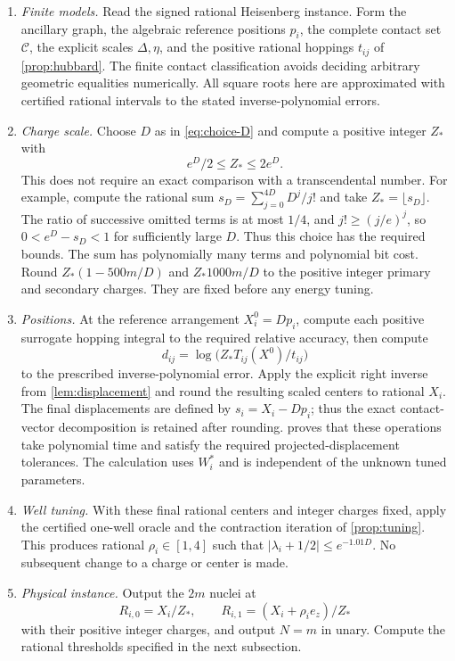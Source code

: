 \begin{enumerate}[label=\arabic*.,leftmargin=*]
\item \emph{Finite models.} Read the signed rational Heisenberg instance. Form the ancillary graph, the algebraic reference positions $p_i$, the complete contact set $\mathcal C$, the explicit scales $\Delta,\eta$, and the positive rational hoppings $t_{ij}$ of \cref{prop:hubbard}. The finite contact classification avoids deciding arbitrary geometric equalities numerically. All square roots here are approximated with certified rational intervals to the stated inverse-polynomial errors.

\item \emph{Charge scale.} Choose $D$ as in \cref{eq:choice-D} and compute a positive integer $Z_*$ with
\[
e^D/2\le Z_*\le2e^D.
\]
This does not require an exact comparison with a transcendental number. For example, compute the rational sum $s_D=\sum_{j=0}^{4D}D^j/j!$ and take $Z_*=\lfloor s_D\rfloor$. The ratio of successive omitted terms is at most $1/4$, and $j!\ge(j/e)^j$, so $0<e^D-s_D<1$ for sufficiently large $D$. Thus this choice has the required bounds. The sum has polynomially many terms and polynomial bit cost. Round $Z_*(1-500m/D)$ and $Z_*1000m/D$ to the positive integer primary and secondary charges. They are fixed before any energy tuning.

\item \emph{Positions.} At the reference arrangement $X_i^0=Dp_i$, compute each positive surrogate hopping integral to the required relative accuracy, then compute
\[
d_{ij}=\log\bigl(Z_*T_{ij}(X^0)/t_{ij}\bigr)
\]
to the prescribed inverse-polynomial error. Apply the explicit right inverse from \cref{lem:displacement} and round the resulting scaled centers to rational $X_i$. The final displacements are defined by $s_i=X_i-Dp_i$; thus the exact contact-vector decomposition is retained after rounding.  proves that these operations take polynomial time and satisfy the required projected-displacement tolerances. The calculation uses $W_i^*$ and is independent of the unknown tuned parameters.

\item \emph{Well tuning.} With these final rational centers and integer charges fixed, apply the certified one-well oracle and the contraction iteration of \cref{prop:tuning}. This produces rational $\rho_i\in[1,4]$ such that $|\lambda_i+1/2|\le e^{-1.01D}$. No subsequent change to a charge or center is made.

\item \emph{Physical instance.} Output the $2m$ nuclei at
\[
R_{i,0}=X_i/Z_*,\qquad
R_{i,1}=(X_i+\rho_i e_z)/Z_*
\]
with their positive integer charges, and output $N=m$ in unary. Compute the rational thresholds specified in the next subsection.
\end{enumerate}

